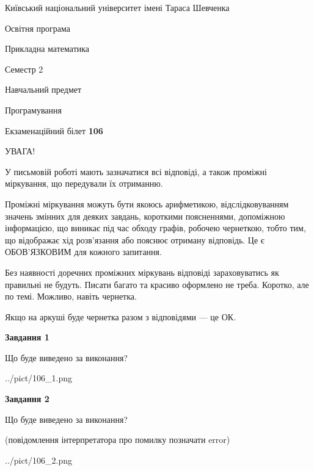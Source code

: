 \documentclass[12pt, ukrainian]{article}
\begin{document}
{{\begin {small}\par
{ \center  Київський національний університет імені Тараса Шевченка \par}
{\parbox {5 cm}{Освітня програма \hfill}{\parbox {7 cm}{Прикладна математика\hfill}}\parbox {6 cm}{\hfill Семестр 2}}\par
{\parbox {5 cm} {Навчальний предмет \hfill}\parbox {7 cm}{Програмування \hfill}\parbox {6cm}{\hfill}\par}\vspace{-7pt} \end{small}}{\center Екзаменаційний білет \No \textbf
{ 106 }\par}}
{
\begin {large}
УВАГА!

У письмовій роботі мають зазначатися всі відповіді, а також проміжні міркування, що передували їх отриманню.

Проміжні міркування можуть бути якоюсь арифметикою, відслідковуванням зна\-чень змінних для деяких завдань,
короткими поясненнями, допоміжною інформацією, що виникає під час обходу графів, робочею чернеткою,
тобто тим, що відображає хід розв’язання або пояснює отриману відповідь.
Це є ОБОВ’ЯЗКОВИМ для кожного запитання.

Без наявності доречних проміжних міркувань відповіді зараховуватись як правиль\-ні не будуть.
Писати багато та красиво оформлено не треба. Коротко, але по темі. Можли\-во, навіть чернетка.

Якщо на аркуші буде чернетка разом з відповідями --- це ОК.

\newpage

{\begin {center}\textbf{Завдання 1}\end {center}}\par
Що буде виведено за виконання?\par
\begin{center}
	{../pict/106_1.png}
\end{center}
\newpage

{\begin {center}\textbf{Завдання 2}\end {center}}\par
Що буде виведено за виконання?\par
 (повідомлення інтерпретатора про помилку позначати error)\par
\begin{center}
	{../pict/106_2.png}
\end{center}
\newpage


\end{large}}
\end{document}
